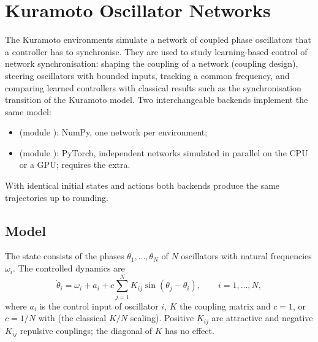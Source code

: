 \begingroup
\setlength{\emergencystretch}{3em}
\chapter{Kuramoto Oscillator Networks}\label{chap:kuramoto}

The Kuramoto environments simulate a network of coupled phase oscillators that
a controller has to synchronise. They are used to study learning-based control
of network synchronisation: shaping the coupling of a network (coupling
design), steering oscillators with bounded inputs, tracking a common frequency,
and comparing learned controllers with classical results such as the
synchronisation transition of the Kuramoto model. Two interchangeable backends
implement the same model:

\begin{itemize}
  \item {} (module ):
        NumPy, one network per environment;
  \item {} (module
        ): PyTorch, 
        independent networks simulated in parallel on the CPU or a GPU; requires
        the  extra.
\end{itemize}

With identical initial states and actions both backends produce the same
trajectories up to  rounding.

\section{Model}\label{sec:kuramoto-model}

The state consists of the phases $\theta_1, \dots, \theta_N$ of $N$ oscillators
with natural frequencies $\omega_i$. The controlled dynamics are
\begin{equation}
  \dot\theta_i = \omega_i + a_i + c \sum_{j=1}^{N} K_{ij} \sin(\theta_j - \theta_i),
  \qquad i = 1, \dots, N,
  \label{eq:kuramoto}
\end{equation}
where $a_i$ is the control input of oscillator $i$, $K$ the coupling matrix and
$c = 1$, or $c = 1/N$ with  (the classical
$K/N$ scaling). Positive $K_{ij}$ are attractive and negative $K_{ij}$
repulsive couplings; the diagonal of $K$ has no effect.

